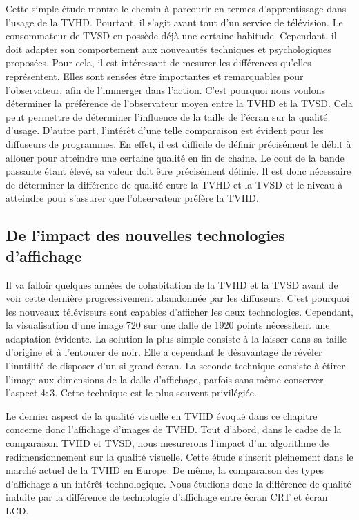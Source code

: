 Cette simple étude montre le chemin à parcourir en termes d'apprentissage dans l'usage de la TVHD. Pourtant, il s'agit avant tout d'un service de télévision. Le consommateur de TVSD en possède déjà une certaine habitude. Cependant, il doit adapter son comportement aux nouveautés techniques et psychologiques proposées. Pour cela, il est intéressant de mesurer les différences qu'elles représentent. Elles sont sensées être importantes et remarquables pour l'observateur, afin de l'immerger dans l'action. C'est pourquoi nous voulons déterminer la préférence de l'observateur moyen entre la TVHD et la TVSD. Cela peut permettre de déterminer l'influence de la taille de l'écran sur la qualité d'usage. D'autre part, l'intérêt d'une telle comparaison est évident pour les diffuseurs de programmes. En effet, il est difficile de définir précisément le débit à allouer pour atteindre une certaine qualité en fin de chaine. Le cout de la bande passante étant élevé, sa valeur doit être précisément définie. Il est donc nécessaire de déterminer la différence de qualité entre la TVHD et la TVSD et le niveau à atteindre pour s'assurer que l'observateur préfère la TVHD.


\subsection{De l'impact des nouvelles technologies d'affichage}
Il va falloir quelques années de cohabitation de la TVHD et la TVSD avant de voir cette dernière progressivement abandonnée par les diffuseurs. C'est pourquoi les nouveaux téléviseurs sont capables d'afficher les deux technologies. Cependant, la visualisation d'une image 720 sur une dalle de 1920 points nécessitent une adaptation évidente. La solution la plus simple consiste à la laisser dans sa taille d'origine et à l'entourer de noir. Elle a cependant le désavantage de révéler l'inutilité de disposer d'un si grand écran. La seconde technique consiste à étirer l'image aux dimensions de la dalle d'affichage, parfois sans même conserver l'aspect 4$:$3. Cette technique est le plus souvent privilégiée.

Le dernier aspect de la qualité visuelle en TVHD évoqué dans ce chapitre concerne donc l'affichage d'images de TVHD. Tout d'abord, dans le cadre de la comparaison TVHD et TVSD, nous mesurerons l'impact d'un algorithme de redimensionnement sur la qualité visuelle. Cette étude s'inscrit pleinement dans le marché actuel de la TVHD en Europe. De même, la comparaison des types d'affichage a un intérêt technologique. Nous étudions donc la différence de qualité induite par la différence de technologie d'affichage entre écran CRT et écran LCD.


